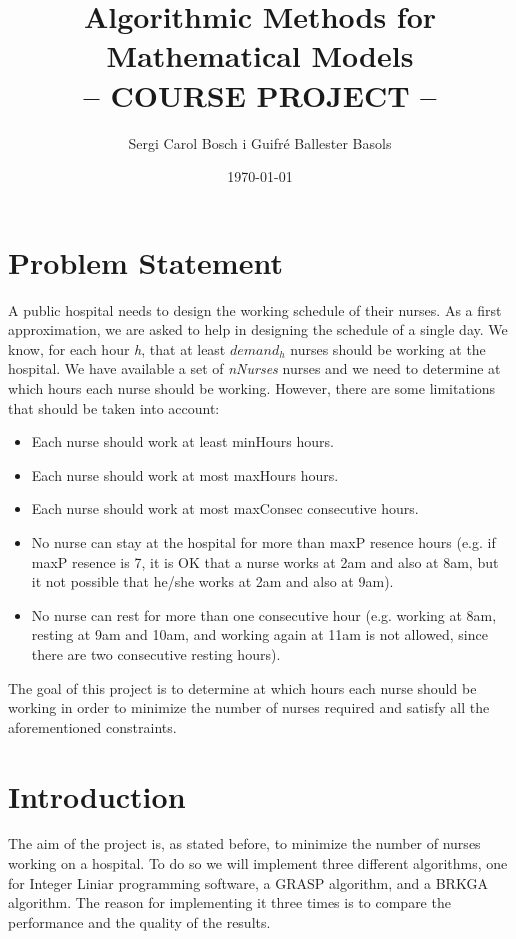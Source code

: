 \documentclass[11pt]{article}
\title{Algorithmic Methods for Mathematical Models\\
– COURSE PROJECT –}
\date{\today}
\author{Sergi Carol Bosch i Guifré Ballester Basols}
\begin{document}
\maketitle

\tableofcontents

\newpage 
\section{Problem Statement}
A public hospital needs to design the working schedule of their nurses. As a first approximation, we are asked to help in designing the schedule of a single day. We know, for each hour \textit{h}, that at least \textit{$demand_h$} nurses should be working at the hospital. We have available a set of \textit{nNurses} nurses and we need to determine at which hours each nurse should be working. However, there are some limitations that should be taken into account:
\begin{itemize}
	\item Each nurse should work at least minHours hours. 
	\item Each nurse should work at most maxHours hours.
	\item Each nurse should work at most maxConsec consecutive hours.
	\item No nurse can stay at the hospital for more than maxP resence hours (e.g. if maxP resence is 7, it is OK that a nurse works at 2am and also at 8am, but it not possible that he/she works at 2am and also at 9am).
	\item No nurse can rest for more than one consecutive hour (e.g. working at 8am, resting at 9am and 10am, and working again at 11am is not allowed, since there are two consecutive resting hours). 
\end{itemize}
The goal of this project is to determine at which hours each nurse should be working in order to minimize the number of nurses required and satisfy all the aforementioned constraints.

\section{Introduction}
The aim of the project is, as stated before, to minimize the number of nurses working on a hospital. To do so we will implement three different algorithms, one for Integer Liniar programming software, a GRASP algorithm, and a BRKGA algorithm. The reason for implementing it three times is to compare the performance and the quality of the results.
\newline
\end{document}
